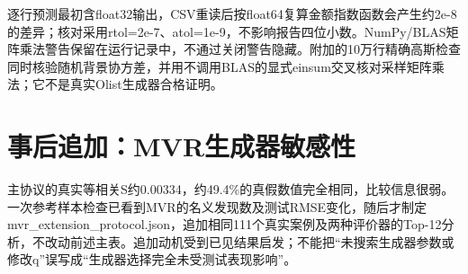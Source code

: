 \documentclass[UTF8,11pt,a4paper]{ctexart}
\begin{document}
逐行预测最初含float32输出，CSV重读后按float64复算金额指数函数会产生约2e-8的差异；核对采用rtol=2e-7、atol=1e-9，不影响报告四位小数。NumPy/BLAS矩阵乘法警告保留在运行记录中，不通过关闭警告隐藏。附加的10万行精确高斯检查同时核验随机背景协方差，并用不调用BLAS的显式einsum交叉核对采样矩阵乘法；它不是真实Olist生成器合格证明。

\section{事后追加：MVR生成器敏感性}\label{ux4e8bux540eux8ffdux52a0mvrux751fux6210ux5668ux654fux611fux6027}

主协议的真实等相关S约0.00334，约49.4\%的真假数值完全相同，比较信息很弱。一次参考样本检查已看到MVR的名义发现数及测试RMSE变化，随后才制定mvr\_extension\_protocol.json，追加相同111个真实案例及两种评价器的Top-12分析，不改动前述主表。追加动机受到已见结果启发；不能把``未搜索生成器参数或修改q''误写成``生成器选择完全未受测试表现影响''。
\end{document}
